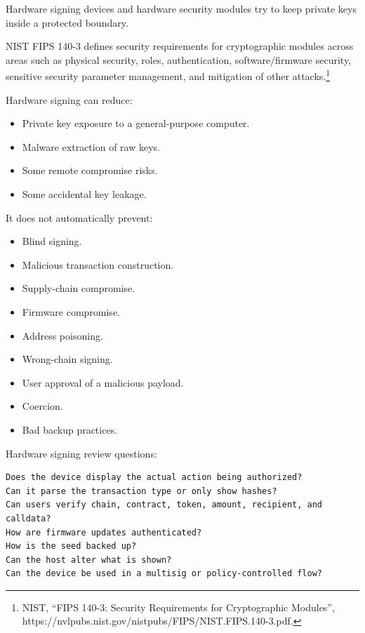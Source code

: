 Hardware signing devices and hardware security modules try to keep
private keys inside a protected boundary.

NIST FIPS 140-3 defines security requirements for cryptographic modules
across areas such as physical security, roles, authentication,
software/firmware security, sensitive security parameter management, and
mitigation of other attacks.\footnote{NIST, ``FIPS 140-3: Security
  Requirements for Cryptographic Modules'',
  https://nvlpubs.nist.gov/nistpubs/FIPS/NIST.FIPS.140-3.pdf.}

Hardware signing can reduce:

\begin{itemize}
\tightlist
\item
  Private key exposure to a general-purpose computer.
\item
  Malware extraction of raw keys.
\item
  Some remote compromise risks.
\item
  Some accidental key leakage.
\end{itemize}

It does not automatically prevent:

\begin{itemize}
\tightlist
\item
  Blind signing.
\item
  Malicious transaction construction.
\item
  Supply-chain compromise.
\item
  Firmware compromise.
\item
  Address poisoning.
\item
  Wrong-chain signing.
\item
  User approval of a malicious payload.
\item
  Coercion.
\item
  Bad backup practices.
\end{itemize}

Hardware signing review questions:

\begin{lstlisting}
Does the device display the actual action being authorized?
Can it parse the transaction type or only show hashes?
Can users verify chain, contract, token, amount, recipient, and calldata?
How are firmware updates authenticated?
How is the seed backed up?
Can the host alter what is shown?
Can the device be used in a multisig or policy-controlled flow?
\end{lstlisting}

